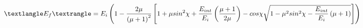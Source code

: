 \documentclass[12pt]{article}
\begin{document}
$$
	\textlangle E_{f}\textrangle = E_{i} \left(1 - \frac{2\mu}{\left(\mu+1\right)^{2}}\left[1 + \mu sin^{2}\chi + \frac{E_{int}}{E_{i}}\left(\frac{\mu+1}{2\mu}\right) - cos\chi\sqrt{1 - \mu^{2}sin^{2}\chi - \frac{E_{int}}{E_{i}}\left(\mu+1\right)}\right]\right)
$$
\end{document}
